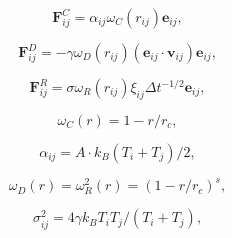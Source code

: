 \documentclass[12pt]{article}
\begin{document}
$$
  \mathbf{F}_{ij}^{C} = \alpha_{ij}{\omega_{C}}(r_{ij})\mathbf{e}_{ij},
$$

$$
  \mathbf{F}_{ij}^{D} = -\gamma {\omega_{D}}(r_{ij})(\mathbf{e}_{ij} \cdot \mathbf{v}_{ij})\mathbf{e}_{ij},
$$

$$
  \mathbf{F}_{ij}^{R} = \sigma {\omega_{R}}(r_{ij}){\xi_{ij}}\Delta t^{-1/2} \mathbf{e}_{ij},
$$

$$
  \omega_{C}(r) = 1 - r/r_c,
$$

$$
  \alpha_{ij} = A\cdot k_B(T_i + T_j)/2,
$$

$$  
  \omega_{D}(r) = \omega^2_{R}(r) = (1-r/r_c)^s,
$$

$$  
  \sigma_{ij}^2 = 4\gamma k_B T_i T_j/(T_i + T_j),
$$
\end{document}
